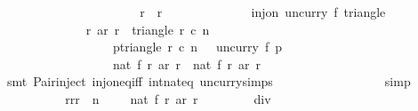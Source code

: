 \begin{isabellebody}
\isanewline
\ \ \ \ \ \ \ \ \ \ \isamarkupfalse%
\isanewline
\isanewline
\ \ \ \ \ \ \ \ \ \ \isamarkupfalse%
\ {\isachardoublequoteopen}r{}\ {\isacharequal}\ r{}{\isachardoublequoteclose}\isanewline
\ \ \ \ \ \ \ \ \ \ \ \ \isamarkupfalse%
\ {\isacharbackquoteopen}inj{\isacharunderscore}on\ {\isacharparenleft}uncurry\ f{\isacharparenright}\ {\isacharparenleft}triangle\ {}\ {}\ {}{}{}{}{\isacharparenright}{\isacharbackquoteclose}\isanewline
\ \ \ \ \ \ \ \ \ \ \ \ \isamarkupfalse%
\ {\isacartoucheopen}{\isacharparenleft}r{}{\isacharcomma}\ ar\ r{}{\isacharparenright}\ {\isasymin}\ triangle\ r{}\ c{}\ n{\isacartoucheclose}\isanewline
\ \ \ \ \ \ \ \ \ \ \ \ \ \ \ \ \ \ {\isacartoucheopen}{\isasymforall}p{\isasymin}triangle\ r{}\ c{}\ n{\isachardot}\ {}{}{}{}\ {\isacharless}\ uncurry\ f\ p{\isacartoucheclose}\isanewline
\ \ \ \ \ \ \ \ \ \ \ \ \ \ \ \ \ \ {\isacartoucheopen}nat\ {\isacharparenleft}f\ r{}\ {\isacharparenleft}ar\ r{}{\isacharparenright}{\isacharparenright}\ {\isacharequal}\ nat\ {\isacharparenleft}f\ r{}\ {\isacharparenleft}ar\ r{}{\isacharparenright}{\isacharparenright}{\isacartoucheclose}\isanewline
\ \ \ \ \ \ \ \ \ \ \ \ \isamarkupfalse%
\ {\isacharparenleft}smt\ Pair{\isacharunderscore}inject\ inj{\isacharunderscore}on{\isacharunderscore}eq{\isacharunderscore}iff\ int{\isacharunderscore}nat{\isacharunderscore}eq\ uncurry{\isachardot}simps{\isacharparenright}\ \isanewline
\ \ \ \ \ \ \ \ \isamarkupfalse%
\isanewline
\ \ \ \ \ \ \isamarkupfalse%
\ simp\isanewline
\ \ \ \ \isamarkupfalse%
\isanewline
\isanewline
\ \ \ \ \isamarkupfalse%
\isanewline
\isanewline
\ \ \ \ \isamarkupfalse%
\ {\isachardoublequoteopen}{\isacharparenleft}{\isasymSum}r{\isacharprime}{\isasymleftarrow}{\isacharbrackleft}r{}{\isachardot}{\isachardot}{\isacharless}{\isacharparenleft}r{}\ {\isacharplus}\ n\ {\isacharminus}\ {}{\isacharparenright}\ {\isacharplus}\ {}{\isacharbrackright}{\isachardot}\ nat\ {\isacharparenleft}f\ r{\isacharprime}\ {\isacharparenleft}ar\ r{\isacharprime}{\isacharparenright}{\isacharparenright}{\isacharparenright}\ {\isasymge}\ {}{}{}{}\ {\isacharasterisk}\ {\isacharparenleft}{}{\isacharasterisk}{}{}{}{}\ {\isacharplus}\ {}{}{}{}\ {\isacharplus}\ {}{\isacharparenright}\ div\ {}{\isachardoublequoteclose}\isanewline

\end{isabellebody}
